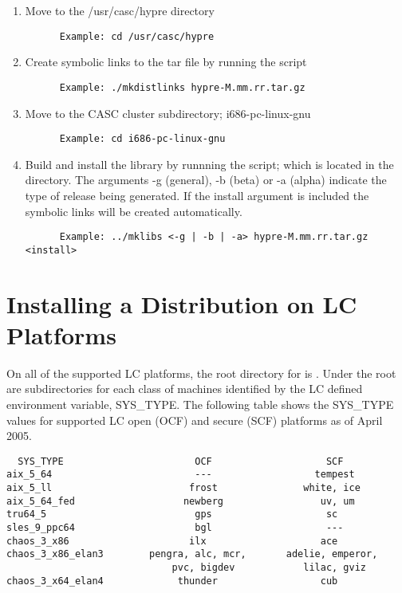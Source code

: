 \begin{enumerate}
\item Move to the /usr/casc/hypre directory
\begin{verbatim}
      Example: cd /usr/casc/hypre
\end{verbatim}
\item Create symbolic links to the tar file by running the  script
\begin{verbatim}
      Example: ./mkdistlinks hypre-M.mm.rr.tar.gz
\end{verbatim}
\item Move to the CASC cluster subdirectory; i686-pc-linux-gnu
\begin{verbatim}
      Example: cd i686-pc-linux-gnu
\end{verbatim}
\item Build and install the library by runnning the  script; which is
         located in the  directory.
      The arguments -g (general), -b (beta) or -a (alpha) indicate the type of 
          release being generated.  If the install argument is included the 
          symbolic links will be created automatically.
\begin{verbatim}
      Example: ../mklibs <-g | -b | -a> hypre-M.mm.rr.tar.gz <install>
\end{verbatim}
\end{enumerate}

\section{Installing a Distribution on LC Platforms}
\label{Installing a Distribution on LC Platforms}

On all of the supported LC platforms, the root directory for \hypre{} is 
.  Under the root are subdirectories for each class 
of machines identified by the LC defined environment variable, SYS\_TYPE.
The following table shows the SYS\_TYPE values for supported LC open (OCF) 
and secure (SCF) platforms as of April 2005.

\begin{verbatim}
  SYS_TYPE                       OCF                    SCF
aix_5_64                         ---                  tempest
aix_5_ll                        frost               white, ice
aix_5_64_fed                   newberg                 uv, um
tru64_5                          gps                    sc
sles_9_ppc64                     bgl                    ---
chaos_3_x86                     ilx                    ace
chaos_3_x86_elan3        pengra, alc, mcr,       adelie, emperor,
                             pvc, bigdev            lilac, gviz
chaos_3_x64_elan4             thunder                  cub
\end{verbatim}

